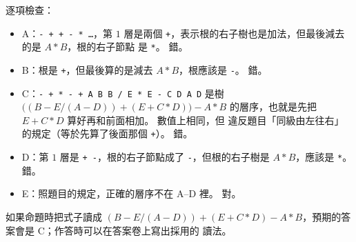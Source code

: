 \begin{pastsoln}
逐項檢查：
\begin{itemize}
\item A：\texttt{- + + - * \ldots}，第 $1$ 層是兩個 \texttt{+}，表示根的右子樹也是加法，但最後減去的是 $A * B$，根的右子節點
是 \texttt{*}。 錯。
\item B：根是 \texttt{+}，但最後算的是減去 $A * B$，根應該是 \texttt{-}。 錯。
\item C：\texttt{- + * - + A B B / E * E - C D A D} 是樹
$\bigl((B - E/(A - D)) + (E + C * D)\bigr) - A * B$ 的層序，也就是先把 $E + C * D$ 算好再和前面相加。 數值上相同，但
違反題目「同級由左往右」的規定（等於先算了後面那個 \texttt{+}）。 錯。
\item D：第 $1$ 層是 \texttt{+ -}，根的右子節點成了 \texttt{-}，但根的右子樹是 $A * B$，應該是 \texttt{*}。 錯。
\item E：照題目的規定，正確的層序不在 A--D 裡。 對。
\end{itemize}
如果命題時把式子讀成 $(B - E/(A - D)) + (E + C * D) - A * B$，預期的答案會是 C；作答時可以在答案卷上寫出採用的
讀法。
\end{pastsoln}
